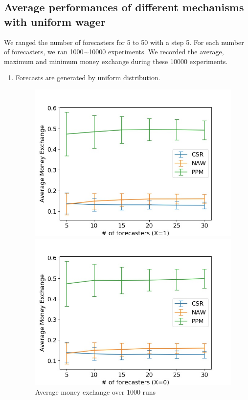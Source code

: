 \documentclass[english,10pt]{article}
\begin{document}
\subsection{Average performances of different mechanisms with uniform wager}
	We ranged the number of forecasters for 5 to 50 with a step 5. For each number of forecasters, we ran 1000$\sim$10000 experiments. We recorded the average, maximum and minimum money exchange during these 10000 experiments.
	\begin{enumerate}
	\newpage
	\item Forecasts are generated by uniform distribution.
        	\begin{figure}[H]
        	\centering
        	\begin{minipage}{0.48\textwidth}
        	\includegraphics[width = \textwidth]{MnEx(UnifF_UnifW)Avg_MnEx(X=1).jpg}
        	\end{minipage}
        	\begin{minipage}{0.48\textwidth}
        \includegraphics[width = \textwidth]{MnEx(UnifF_UnifW)Avg_MnEx(X=0).jpg}
        	\end{minipage}
        	\caption{Average money exchange over 1000 runs}
        	\end{figure}
        	

\end{enumerate}
\end{document}
